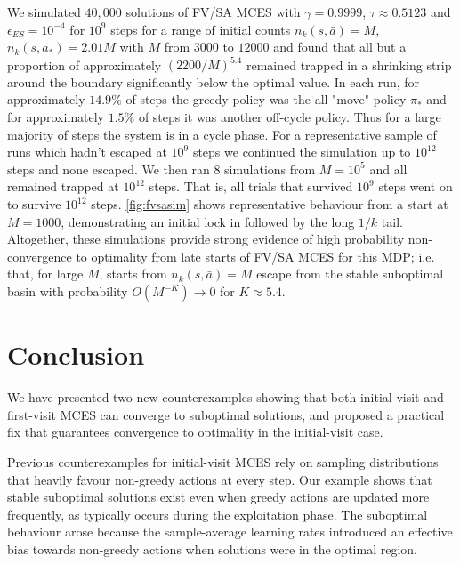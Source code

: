 \documentclass{article}
\begin{document}
We simulated $40,000$ solutions of FV/SA MCES with $\gamma=0.9999$, $\tau\approx 0.5123$ and $\epsilon_{ES}=10^{-4}$ for $10^9$ steps for a range of initial counts $n_k(s,\bar a)=M$, $n_k(s,a_*)=2.01M$ with $M$ from  $3000$ to $12000$ and found that all but a proportion of approximately $(2200/M)^{5.4}$ remained trapped in a shrinking strip around the boundary significantly below the optimal value. In each run, for approximately $14.9\%$ of steps the greedy policy was the all-"move" policy $\pi_*$ and for approximately $1.5\%$ of steps it was another off-cycle policy. Thus for a large majority of steps the system is in a cycle phase.       
For a representative sample of runs which hadn't escaped at $10^9$ steps we continued the simulation up to $10^{12}$ steps and none escaped. We then ran $8$ simulations from $M=10^5$ and all remained trapped at $10^{12}$ steps. That is, all trials that survived $10^9$ steps went on to survive $10^{12}$ steps. 
\autoref{fig:fvsasim} shows representative behaviour from a start at $M=1000$, demonstrating an initial lock in followed by the long $1/k$ tail.
Altogether, these simulations provide strong evidence 
of high probability non-convergence to optimality from late starts of FV/SA MCES for this MDP; i.e.
that, for large $M$, starts from $n_k(s,\bar a)=M$ escape from the stable suboptimal basin with probability $O(M^{-K})\rightarrow 0$ for $K\approx 5.4$. 




\section{Conclusion}

We have presented two new counterexamples showing that both initial-visit and first-visit MCES can converge to suboptimal solutions, 
and proposed a practical fix that guarantees convergence to optimality in the initial-visit case.

Previous counterexamples for initial-visit MCES rely on sampling distributions that heavily favour non-greedy actions at every step.
Our example shows that stable suboptimal solutions exist even when greedy actions are updated more frequently, as typically occurs during the exploitation phase.
The suboptimal behaviour arose because the sample-average learning rates introduced an effective bias towards non-greedy actions when solutions were in the optimal region.
\end{document}
